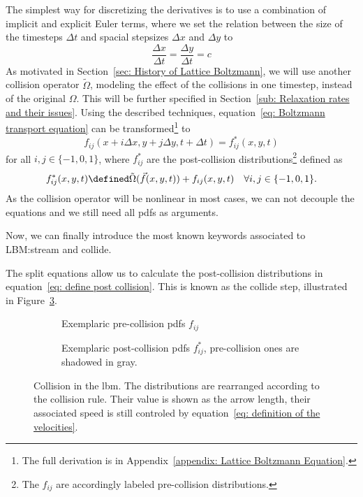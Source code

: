 The simplest way for discretizing the derivatives is to use a combination of implicit and explicit Euler terms, where we set the relation between the size of the timesteps $\Delta t$ and spacial stepsizes $\Delta x$ and $\Delta y$ to
\begin{equation}
  \label{eq: relation between stepsizes}
  \frac{\Delta x} {\Delta{t}} = \frac{\Delta y} {\Delta{t}} = c
\end{equation}
As motivated in Section~\ref{sec: History of Lattice Boltzmann}, we will use another collision operator $\tilde{\Omega}$, modeling the effect of the collisions in one timestep, instead of the original $\Omega$.
This will be further specified in Section~\ref{sub: Relaxation rates and their issues}.
Using the described techniques, equation~\eqref{eq: Boltzmann transport equation} can be transformed\footnote{The full derivation is in Appendix~\ref{appendix: Lattice Boltzmann Equation}.} to
\begin{equation}
  \label{eq: lattice boltzmann equation}
    f_{ij}(x + i \Delta x , y + j \Delta y,t + \Delta t)
    = f_{ij}^*(x, y, t)
\end{equation}
for all $i,j\in \{-1, 0, 1\}$, where $f_{ij}^*$ are the post-collision distributions\footnote{The $f_{ij}$ are accordingly labeled pre-collision distributions.
} defined as
\begin{equation}
  \label{eq: define post collision}
  f_{ij}^*(x, y, t) \defined \tilde{\Omega}(\vec{f}(x,y,t)) + f_{ij}(x,y,t) \quad\forall i,j\in \{-1, 0, 1\}.
\end{equation}
As the collision operator will be nonlinear in most cases, we can not decouple the equations and we still need all \glspl{pdf} as arguments.

Now, we can finally introduce the most known keywords associated to LBM:\@ stream and collide.

The split equations allow us to calculate the post-collision distributions in equation~\eqref{eq: define post collision}.
This is known as the collide step, illustrated in Figure~\ref{fig: examplary collision}.

\begin{figure}
\centering
\begin{subfigure}{.5\textwidth}
  \centering
  
\caption{Exemplaric pre-collision \glspl{pdf} $f_{ij}$\linebreak}
\label{fig: pre-collision example}
\end{subfigure}%
\begin{subfigure}{.5\textwidth}
  \centering
  
\caption{Exemplaric post-collision \glspl{pdf} $f_{ij}^*$, pre-collision ones are shadowed in gray.}
\label{fig: post-collision example}
\end{subfigure}
\caption{Collision in the \gls{lbm}.
The distributions are rearranged according to the collision rule.
Their value is shown as the arrow length, their associated speed is still controled by equation~\eqref{eq: definition of the velocities}.}
\label{fig: examplary collision}
\end{figure}

